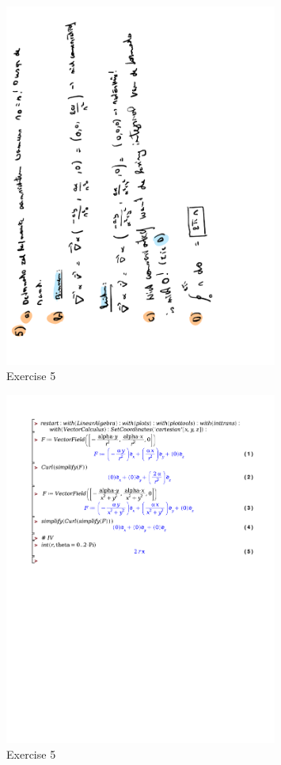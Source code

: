 \documentclass[a4paper]{report}
\begin{document}
\begin{figure}[H]
	\centering
	\includegraphics[angle=-90, width=0.8\textwidth]{assets/huis_6_ex_5.pdf}
	\caption{Exercise 5}
	\label{fig:huis_6_ex_5}
\end{figure}

\begin{figure}[H]
	\centering
	\includegraphics[width=0.8\textwidth]{exercises/huis_6_ex_5.pdf}
	\caption{Exercise 5}
	\label{fig:huis_6_ex_5_maple}
\end{figure}
\end{document}
